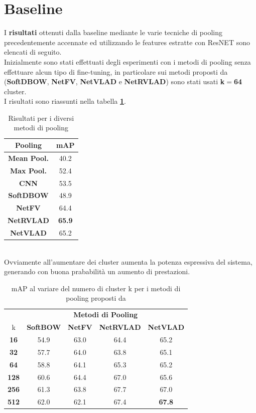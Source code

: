 \section{Baseline}
I \textbf{risultati} ottenuti dalla baseline mediante le varie tecniche di pooling precedentemente accennate ed utilizzando le features estratte con ResNET sono elencati di seguito.\cite{soccerNet} 
\\Inizialmente sono stati effettuati degli esperimenti con i metodi di pooling senza effettuare alcun tipo di fine-tuning, in particolare sui metodi proposti da \citet{MiechPooling} (\textbf{SoftDBOW}, \textbf{NetFV}, \textbf{NetVLAD} e \textbf{NetRVLAD}) sono stati usati \textbf{k$=$64} cluster.
\\I risultati sono riassunti nella tabella \textbf{\ref{table: baselinek16}}.
\begin{table}[ht]
\caption{Risultati per i diversi metodi di pooling}
\centering
\begin{tabular}{c| | c}
\textbf{Pooling} & \textbf{mAP} \\
\hline
\textbf{Mean Pool.} & 40.2 \\
\textbf{Max Pool.} &  52.4\\
\textbf{CNN} & 53.5\\
\textbf{SoftDBOW} & 48.9\\
\textbf{NetFV} & 64.4\\
\textbf{NetRVLAD} & \textbf{65.9}\\
\textbf{NetVLAD} & 65.2\\ [1ex]

\end{tabular}
\label{table: baselinek16}
\end{table}
\\Ovviamente all'aumentare dei cluster aumenta la potenza espressiva del sistema, generando con buona prababilità un aumento di prestazioni.
\begin{table}[ht]

\caption{mAP al variare del numero di cluster k per i metodi di pooling proposti da \citet{MiechPooling}}
\label{table: baselinek16to512}
\centering
\begin{tabular}{c| | c|c|c |  c}
&\multicolumn{4}{c}{\textbf{Metodi di Pooling}} \\
k & \textbf{SoftBOW} & \textbf{NetFV} & \textbf{NetRVLAD} & \textbf{NetVLAD} \\
\hline
\textbf{16}& 54.9 & 63.0 & 64.4 & 65.2 \\
\textbf{32} & 57.7 & 64.0 & 63.8 & 65.1 \\
\textbf{64}& 58.8 &  64.1 & 65.3 & 65.2 \\
\textbf{128}& 60.6 & 64.4 & 67.0 & 65.6 \\
\textbf{256}& 61.3 & 63.8 & 67.7 & 67.0 \\
\textbf{512} & 62.0 & 62.1 & 67.4 & \textbf{67.8} \\[1ex]

\end{tabular}
\end{table}
